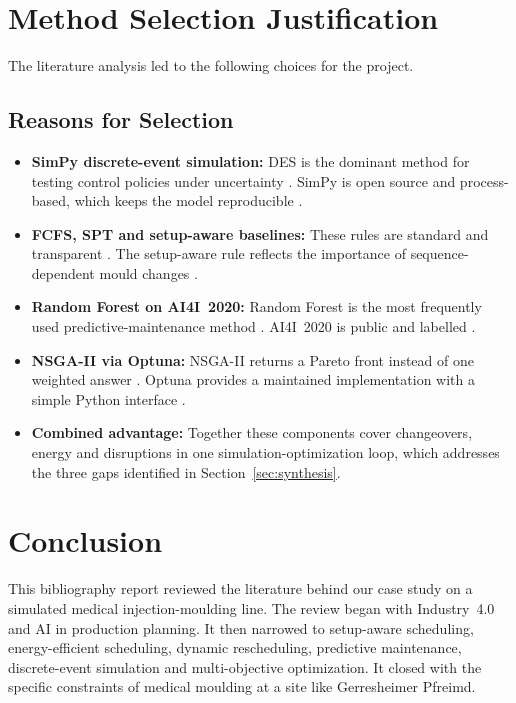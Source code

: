 \documentclass[11pt,a4paper]{article}
\begin{document}
\section{Method Selection Justification}
\label{sec:justification}
The literature analysis led to the following choices for the project.

\subsection{Reasons for Selection}
\begin{itemize}
  \item \textbf{SimPy discrete-event simulation:} DES is the dominant method for testing control policies under uncertainty \cite{negahban2014}. SimPy is open source and process-based, which keeps the model reproducible \cite{simpy}.
  \item \textbf{FCFS, SPT and setup-aware baselines:} These rules are standard and transparent \cite{pinedo2016}. The setup-aware rule reflects the importance of sequence-dependent mould changes \cite{allahverdi2008}.
  \item \textbf{Random Forest on AI4I~2020:} Random Forest is the most frequently used predictive-maintenance method \cite{carvalho2019,breiman2001}. AI4I~2020 is public and labelled \cite{matzka2020}.
  \item \textbf{NSGA-II via Optuna:} NSGA-II returns a Pareto front instead of one weighted answer \cite{deb2002}. Optuna provides a maintained implementation with a simple Python interface \cite{akiba2019}.
  \item \textbf{Combined advantage:} Together these components cover changeovers, energy and disruptions in one simulation-optimization loop, which addresses the three gaps identified in Section~\ref{sec:synthesis}.
\end{itemize}

\section{Conclusion}
\label{sec:conclusion}
This bibliography report reviewed the literature behind our case study on a simulated medical injection-moulding line. The review began with Industry~4.0 and AI in production planning. It then narrowed to setup-aware scheduling, energy-efficient scheduling, dynamic rescheduling, predictive maintenance, discrete-event simulation and multi-objective optimization. It closed with the specific constraints of medical moulding at a site like Gerresheimer Pfreimd.
\end{document}
